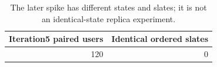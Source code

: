 \begin{table}[htbp!]
\centering
\small
\setlength{\tabcolsep}{3pt}
\renewcommand{\arraystretch}{1.1}
\begin{tabular}{rr}
\hline
Iteration5 paired users & Identical ordered slates \\
\hline
120 & 0 \\
\hline
\end{tabular}
\caption{The later spike has different states and slates; it is not an identical-state replica experiment.}
\label{chap:results:tab:rq1_seed44_spike_later_context}
\end{table}
